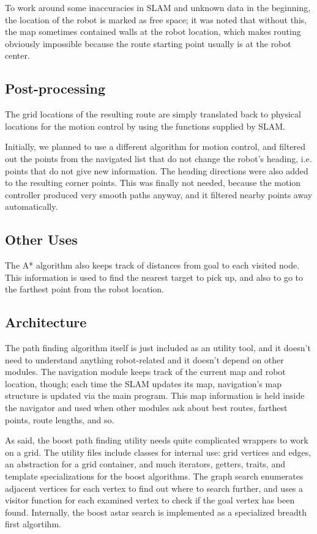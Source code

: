 \documentclass[a4paper,10pt]{article}
\begin{document}
To work around some inaccuracies in SLAM and unknown data in the beginning, the location of the robot is marked as free space; it was noted that without this, the map sometimes contained walls at the robot location, which makes routing obviously impossible because the route starting point usually is at the robot center.

\subsection{Post-processing}

The grid locations of the resulting route are simply translated back to physical locations for the motion control by using the functions supplied by SLAM.

Initially, we planned to use a different algorithm for motion control, and filtered out the points from the navigated list that do not change the robot's heading, i.e. points that do not give new information. The heading directions were also added to the resulting corner points. This was finally not needed, because the motion controller produced very smooth paths anyway, and it filtered nearby points away automatically.

\subsection{Other Uses}

The A* algorithm also keeps track of distances from goal to each visited node. This information is used to find the nearest target to pick up, and also to go to the farthest point from the robot location.

\subsection{Architecture}

The path finding algorithm itself is just included as an utility tool, and it doesn't need to understand anything robot-related and it doesn't depend on other modules. The navigation module keeps track of the current map and robot location, though; each time the SLAM updates its map, navigation's map structure is updated via the main program. This map information is held inside the navigator and used when other modules ask about best routes, farthest points, route lengths, and so.

As said, the boost path finding utility needs quite complicated wrappers to work on a grid. The utility files include classes for internal use: grid vertices and edges, an abstraction for a grid container, and much iterators, getters, traits, and template specializations for the boost algorithms. The graph search enumerates adjacent vertices for each vertex to find out where to search further, and uses a visitor function for each examined vertex to check if the goal vertex has been found. Internally, the boost astar search is implemented as a specialized breadth first algortihm.
\end{document}
